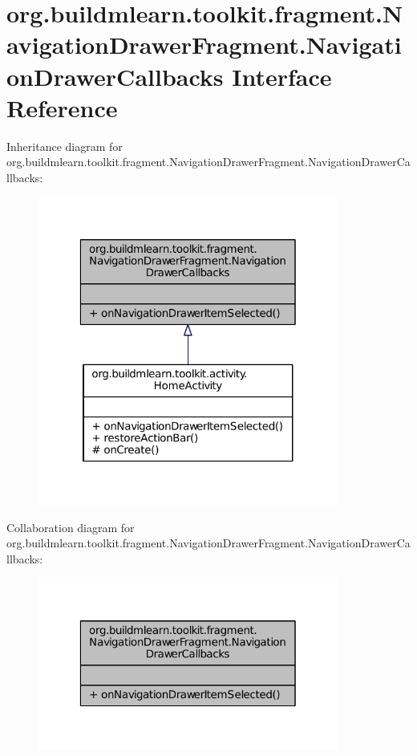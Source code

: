 \hypertarget{interfaceorg_1_1buildmlearn_1_1toolkit_1_1fragment_1_1NavigationDrawerFragment_1_1NavigationDrawerCallbacks}{\section{org.\-buildmlearn.\-toolkit.\-fragment.\-Navigation\-Drawer\-Fragment.\-Navigation\-Drawer\-Callbacks Interface Reference}
\label{interfaceorg_1_1buildmlearn_1_1toolkit_1_1fragment_1_1NavigationDrawerFragment_1_1NavigationDrawerCallbacks}
}


Inheritance diagram for org.\-buildmlearn.\-toolkit.\-fragment.\-Navigation\-Drawer\-Fragment.\-Navigation\-Drawer\-Callbacks\-:
\nopagebreak
\begin{figure}[H]
\begin{center}
\leavevmode
\includegraphics[width=280pt]{d6/d14/interfaceorg_1_1buildmlearn_1_1toolkit_1_1fragment_1_1NavigationDrawerFragment_1_1NavigationDrawerCallbacks__inherit__graph}
\end{center}
\end{figure}


Collaboration diagram for org.\-buildmlearn.\-toolkit.\-fragment.\-Navigation\-Drawer\-Fragment.\-Navigation\-Drawer\-Callbacks\-:
\nopagebreak
\begin{figure}[H]
\begin{center}
\leavevmode
\includegraphics[width=280pt]{d2/d33/interfaceorg_1_1buildmlearn_1_1toolkit_1_1fragment_1_1NavigationDrawerFragment_1_1NavigationDrawerCallbacks__coll__graph}
\end{center}
\end{figure}

